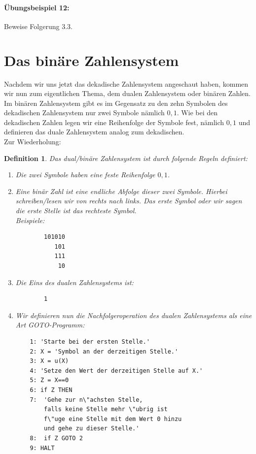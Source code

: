 \documentclass[11pt,a4paper,leqno]{report}
\newtheorem{definition}[theorem]{Definition}
\numberwithin{equation}{chapter}
\begin{document}
\paragraph{\"Ubungsbeispiel 12:} Beweise Folgerung 3.3.
\section{Das bin\"are Zahlensystem}
Nachdem wir uns jetzt das dekadische Zahlensystem angeschaut haben, kommen wir nun zum eigentlichen Thema, dem dualen Zahlensystem oder bin\"aren Zahlen. Im bin\"aren Zahlensystem gibt es im Gegensatz zu den zehn Symbolen des dekadischen Zahlensystem nur zwei Symbole n\"amlich ${0, 1}$. Wie bei den dekadischen Zahlen legen wir eine Reihenfolge der Symbole fest, n\"amlich $0, 1$ und definieren das duale Zahlensystem analog zum dekadischen.\\
Zur Wiederholung: 
\begin{definition}
	Das dual/bin\"are Zahlensystem ist durch folgende Regeln definiert:
	\begin{enumerate}
		\item Die zwei Symbole haben eine feste Reihenfolge $0, 1$.
		\item Eine bin\"ar Zahl ist eine endliche Abfolge dieser zwei Symbole. Hierbei schreiben/lesen wir von rechts nach links. Das erste Symbol oder wir sagen die erste Stelle ist das rechteste Symbol. \\Beispiele:
		\begin{lstlisting}
		101010
		   101
		   111
		    10
		\end{lstlisting}
		\item Die Eins des dualen Zahlensystems ist:
		\begin{lstlisting}
		1
		\end{lstlisting}
		\item Wir definieren nun die Nachfolgeroperation des dualen Zahlensystems als eine Art GOTO-Programm:
			\begin{lstlisting}
	1: 'Starte bei der ersten Stelle.'
	2: X = 'Symbol an der derzeitigen Stelle.'
	3: X = u(X)
	4: 'Setze den Wert der derzeitigen Stelle auf X.'
	5: Z = X==0
	6: if Z THEN
	7: 	'Gehe zur n\"achsten Stelle, 
		falls keine Stelle mehr \"ubrig ist 
		f\"uge eine Stelle mit dem Wert 0 hinzu
		und gehe zu dieser Stelle.'
	8:	if Z GOTO 2
	9: HALT
			\end{lstlisting}
	\end{enumerate}
\end{definition}
\end{document}
